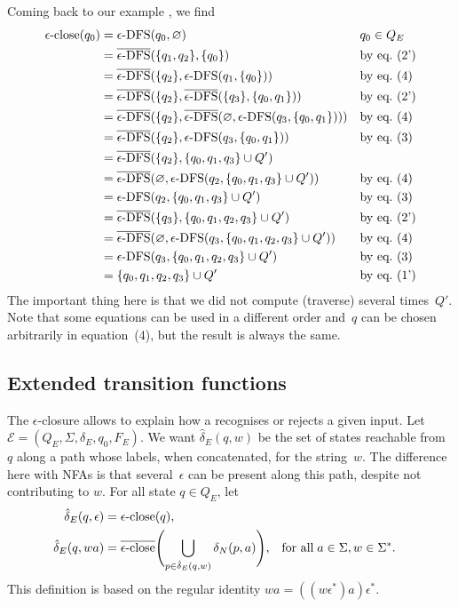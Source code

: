Coming back to our example , we find
\begin{align*}
   \epsilon\text{-close} (q_0) 
&= \epsilon\text{-DFS} (q_0, \varnothing)
&& q_0 \in Q_E\\
&= \overline{\epsilon\text{-DFS}} (\{q_1, q_2\}, \{q_0\})
&& \text{by eq.~(2')}\\
&= \overline{\epsilon\text{-DFS}} (\{q_2\}, \epsilon\text{-DFS} (q_1, \{q_0\}))
&& \text{by eq.~(4)}\\
&= \overline{\epsilon\text{-DFS}} (\{q_2\}, \overline{\epsilon\text{-DFS}} (\{q_3\}, \{q_0,
   q_1\}))
&& \text{by eq.~(2')}\\
&= \overline{\epsilon\text{-DFS}} (\{q_2\}, \overline{\epsilon\text{-DFS}} (\varnothing, \epsilon\text{-DFS} (q_3, \{q_0, q_1\})))
&& \text{by eq.~(4)}\\
&= \overline{\epsilon\text{-DFS}} (\{q_2\}, \epsilon\text{-DFS} (q_3, \{q_0, q_1\}))
&& \text{by eq.~(3)}\\
&= \overline{\epsilon\text{-DFS}} (\{q_2\}, \{q_0, q_1, q_3\} \cup Q')\\
&= \overline{\epsilon\text{-DFS}} (\varnothing, \epsilon\text{-DFS} (q_2, \{q_0, q_1, q_3\} \cup Q'))
&& \text{by eq.~(4)}\\
&= \epsilon\text{-DFS} (q_2, \{q_0, q_1, q_3\} \cup Q')
&& \text{by eq.~(3)}\\
&= \overline{\epsilon\text{-DFS}} (\{q_3\}, \{q_0, q_1, q_2, q_3\} \cup Q')
&& \text{by eq.~(2')}\\
&= \overline{\epsilon\text{-DFS}} (\varnothing, \epsilon\text{-DFS} (q_3, \{q_0, q_1, q_2, q_3\} \cup Q'))
&& \text{by eq.~(4)}\\
&= \epsilon\text{-DFS} (q_3, \{q_0, q_1, q_2, q_3\} \cup Q')
&& \text{by eq.~(3)}\\
&= \{q_0, q_1, q_2, q_3\} \cup Q'
&& \text{by eq.~(1')}\\
\end{align*}
The important thing here is that we did not compute (traverse) several
times~\(Q'\). Note that some equations can be used in a different
order and~\(q\) can be chosen arbitrarily in equation~(4), but the
result is always the same.

\subsection*{Extended transition functions}

The \(\epsilon\)-closure allows to explain how a \eNFA recognises or
rejects a given input. Let \(\mathcal{E} = (Q_E, \Sigma, \delta_E,
q_0, F_E)\). We want \(\hat{\delta}_E (q, w)\) be the set of states
reachable from~\(q\) along a path whose labels, when concatenated, for
the string~\(w\). The difference here with NFAs is that
several~\(\epsilon\) can be present along this path, despite not
contributing to \(w\).  For all state \(q \in Q_E\), let
\begin{align*}
   \hat{\delta}_E (q, \epsilon)
&= \epsilon\text{-close} (q),\\
   \hat{\delta}_E (q, wa)
&= \overline{\epsilon\text{-close}} \Biggl(\bigcup_{p \in \hat{\delta}_E (q, w)}{\delta_N (p,
     a)}\Biggr),
&& \text{for all} \; a \in \Sigma, w \in \Sigma^{*}.
\end{align*}
This definition is based on the regular identity \(wa =
((w\epsilon^{*})a)\epsilon^{*}\).

